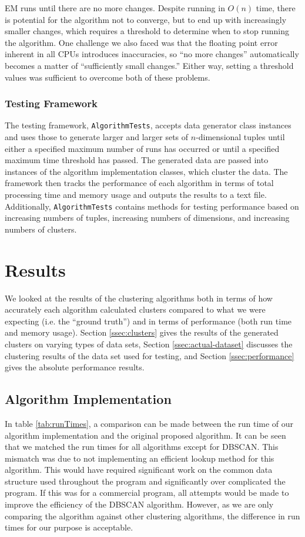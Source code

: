 \documentclass[11pt,letterpaper]{article}
\begin{document}
EM runs until there are no more changes.  Despite running in $O(n)$ time, there is potential for the algorithm not to converge, but to end up with increasingly smaller changes, which requires a threshold to determine when to stop running the algorithm.  One challenge we also faced was that the floating point error inherent in all CPUs introduces inaccuracies, so ``no more changes'' automatically becomes a matter of ``sufficiently small changes.''  Either way, setting a threshold values was sufficient to overcome both of these problems.

\subsubsection{Testing Framework}
The testing framework, \verb+AlgorithmTests+, accepts data generator class instances and uses those to generate larger and larger sets of $n$-dimensional tuples until either a specified maximum number of runs has occurred or until a specified maximum time threshold has passed.  The generated data are passed into instances of the algorithm implementation classes, which cluster the data.  The framework then tracks the performance of each algorithm in terms of total processing time and memory usage and outputs the results to a text file.  Additionally, \verb+AlgorithmTests+ contains methods for testing performance based on increasing numbers of tuples, increasing numbers of dimensions, and increasing numbers of clusters.

\section{Results}
We looked at the results of the clustering algorithms both in terms of how accurately each algorithm calculated clusters compared to what we were expecting (i.e. the ``ground truth'') and in terms of performance (both run time and memory usage).  Section \ref{ssec:clusters} gives the results of the generated clusters on varying types of data sets, Section \ref{ssec:actual-dataset} discusses the clustering results of the data set used for testing, and Section \ref{ssec:performance} gives the absolute performance results.

\subsection{Algorithm Implementation}
In table \ref{tab:runTimes}, a comparison can be made between the run time of our algorithm implementation and the original proposed algorithm.  It can be seen that we matched the run times for all algorithms except for DBSCAN.  This mismatch was due to not implementing an efficient lookup method for this algorithm.  This would have required significant work on the common data structure used throughout the program and significantly over complicated the program.  If this was for a commercial program, all attempts would be made to improve the efficiency of the DBSCAN algorithm.  However, as we are only comparing the algorithm against other clustering algorithms, the difference in run times for our purpose is acceptable.   
\end{document}
